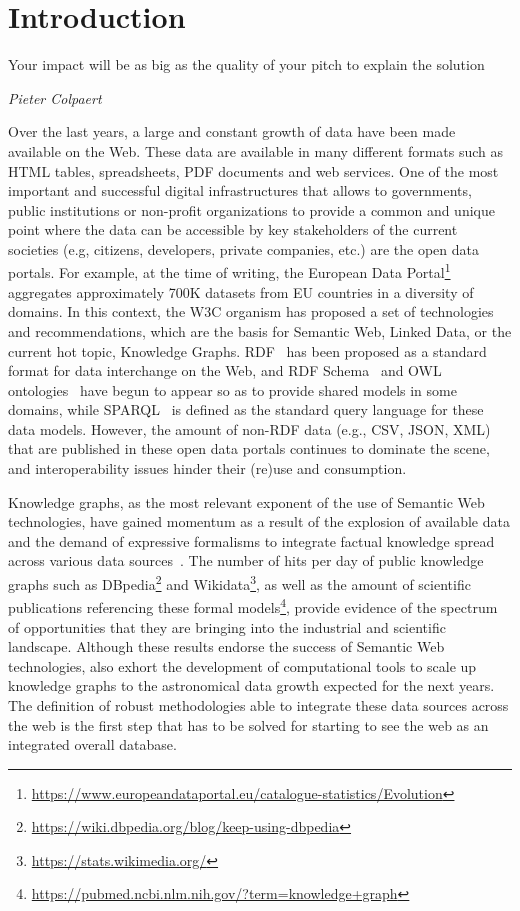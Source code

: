 \chapter{Introduction}
\label{chap:intro}

\epigraph{Your impact will be as big as the quality of your pitch to explain the solution}{\textit{Pieter Colpaert}}

Over the last years, a large and constant growth of data have been made available on the Web. These data are available in many different formats such as HTML tables, spreadsheets, PDF documents and web services. One of the most important and successful digital infrastructures that allows to governments, public institutions or non-profit organizations to provide a common and unique point where the data can be accessible by key stakeholders of the current societies (e.g, citizens, developers, private companies, etc.) are the open data portals. For example, at the time of writing, the European Data Portal\footnote{\url{https://www.europeandataportal.eu/catalogue-statistics/Evolution}} aggregates approximately 700K datasets from EU countries in a diversity of domains. In this context, the W3C organism has proposed a set of technologies and recommendations, which are the basis for Semantic Web, Linked Data, or the current hot topic, Knowledge Graphs. RDF~\citep{brickley1999resource} has been proposed as a standard format for data interchange on the Web, and RDF Schema~\citep{brickley2014rdf} and OWL ontologies~\citep{mcguinness2004owl} have begun to appear so as to provide shared models in some domains, while SPARQL~\citep{perez2009semantics} is defined as the standard query language for these data models. However, the amount of non-RDF data (e.g., CSV, JSON, XML) that are published in these open data portals continues to dominate the scene, and interoperability issues hinder their (re)use and consumption. 

Knowledge graphs, as the most relevant exponent of the use of Semantic Web technologies, have gained momentum as a result of the explosion of available data and the demand of expressive formalisms to integrate factual knowledge spread across various data sources~\citep{abs-2003-02320}. The number of hits per day of public knowledge graphs such as DBpedia\footnote{\url{https://wiki.dbpedia.org/blog/keep-using-dbpedia}} and Wikidata\footnote{\url{https://stats.wikimedia.org/}}, as well as the amount of scientific publications referencing these formal models\footnote{\url{https://pubmed.ncbi.nlm.nih.gov/?term=knowledge+graph}}, provide evidence of the spectrum of opportunities that they are bringing into the industrial and scientific landscape. Although these results endorse the success of Semantic Web technologies, also exhort the development of computational tools to scale up knowledge graphs to the astronomical data growth expected for the next years. The definition of robust methodologies able to integrate these data sources across the web is the first step that has to be solved for starting to see the web as an integrated overall database.


